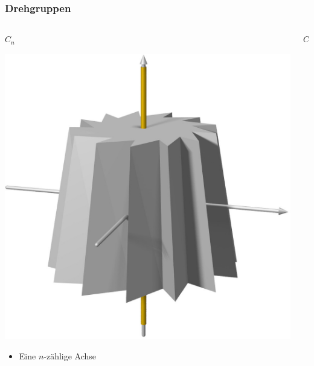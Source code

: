 %
%
%
\bgroup
\begin{frame}[t]
\setlength{\abovedisplayskip}{5pt}
\setlength{\belowdisplayskip}{5pt}
\frametitle{Drehgruppen}
\vspace{-25pt}
\begin{columns}[t,onlytextwidth]
\begin{column}{0.33\textwidth}
\begin{block}{$C_n$}
\begin{center}
\includegraphics[width=\textwidth]{../slides/6/punktgruppen/images/cn.jpg}
\end{center}
\begin{itemize}
\item Eine $n$-zählige Achse
\end{itemize}
\end{block}
\end{column}
\begin{column}{0.33\textwidth}
\begin{block}{$C_{nv}$}
\begin{center}

\end{center}
\end{block}
\end{column}
\end{columns}
\end{frame}
